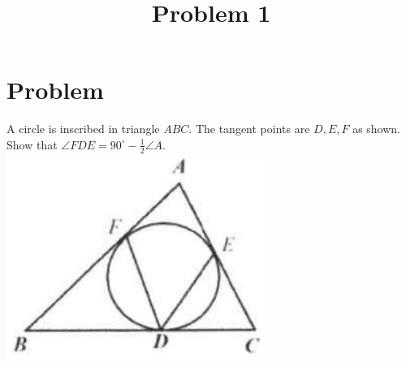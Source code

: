 \documentclass{article}
\title{Problem 1}
\date{}
\begin{document}
\maketitle

\section*{Problem}
A circle is inscribed in triangle \(A B C\). The tangent points are \(D, E, F\) as shown. Show that \(\angle F D E=90^{\circ}-\frac{1}{2} \angle A\).\\
\centering
\includegraphics[width=\textwidth]{images/problem_image_1.jpg}
\end{document}
